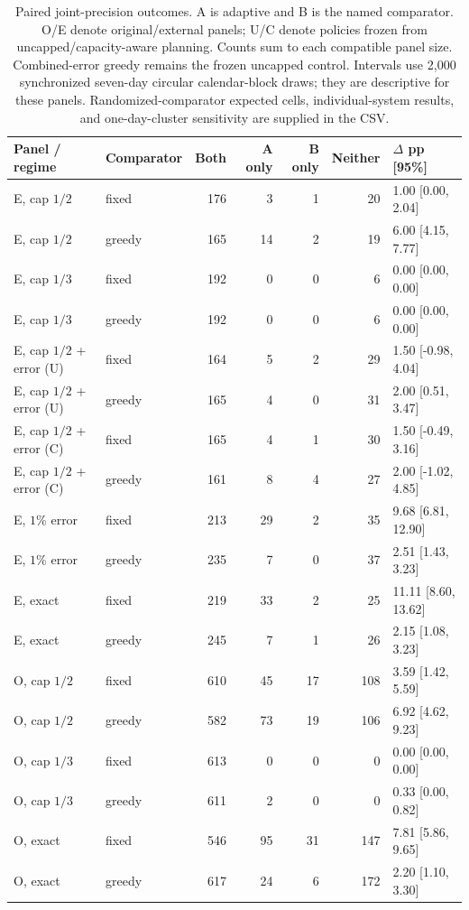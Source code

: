 \begin{table}[htbp]
\centering\scriptsize
\begin{tabular}{llrrrrl}
\toprule
Panel / regime & Comparator & Both & A only & B only & Neither & $\Delta$ pp [95\%]\\
\midrule
E, cap $1/2$ & fixed & 176 & 3 & 1 & 20 & 1.00 [0.00, 2.04]\\
E, cap $1/2$ & greedy & 165 & 14 & 2 & 19 & 6.00 [4.15, 7.77]\\
E, cap $1/3$ & fixed & 192 & 0 & 0 & 6 & 0.00 [0.00, 0.00]\\
E, cap $1/3$ & greedy & 192 & 0 & 0 & 6 & 0.00 [0.00, 0.00]\\
E, cap $1/2$ + error (U) & fixed & 164 & 5 & 2 & 29 & 1.50 [-0.98, 4.04]\\
E, cap $1/2$ + error (U) & greedy & 165 & 4 & 0 & 31 & 2.00 [0.51, 3.47]\\
E, cap $1/2$ + error (C) & fixed & 165 & 4 & 1 & 30 & 1.50 [-0.49, 3.16]\\
E, cap $1/2$ + error (C) & greedy & 161 & 8 & 4 & 27 & 2.00 [-1.02, 4.85]\\
E, $1\%$ error & fixed & 213 & 29 & 2 & 35 & 9.68 [6.81, 12.90]\\
E, $1\%$ error & greedy & 235 & 7 & 0 & 37 & 2.51 [1.43, 3.23]\\
E, exact & fixed & 219 & 33 & 2 & 25 & 11.11 [8.60, 13.62]\\
E, exact & greedy & 245 & 7 & 1 & 26 & 2.15 [1.08, 3.23]\\
O, cap $1/2$ & fixed & 610 & 45 & 17 & 108 & 3.59 [1.42, 5.59]\\
O, cap $1/2$ & greedy & 582 & 73 & 19 & 106 & 6.92 [4.62, 9.23]\\
O, cap $1/3$ & fixed & 613 & 0 & 0 & 0 & 0.00 [0.00, 0.00]\\
O, cap $1/3$ & greedy & 611 & 2 & 0 & 0 & 0.33 [0.00, 0.82]\\
O, exact & fixed & 546 & 95 & 31 & 147 & 7.81 [5.86, 9.65]\\
O, exact & greedy & 617 & 24 & 6 & 172 & 2.20 [1.10, 3.30]\\
\bottomrule
\end{tabular}
\caption{Paired joint-precision outcomes. A is adaptive and B is the named comparator. O/E denote original/external panels; U/C denote policies frozen from uncapped/capacity-aware planning. Counts sum to each compatible panel size. Combined-error greedy remains the frozen uncapped control. Intervals use 2,000 synchronized seven-day circular calendar-block draws; they are descriptive for these panels. Randomized-comparator expected cells, individual-system results, and one-day-cluster sensitivity are supplied in the CSV.}
\label{tab:joint_paired_outcomes}
\end{table}
